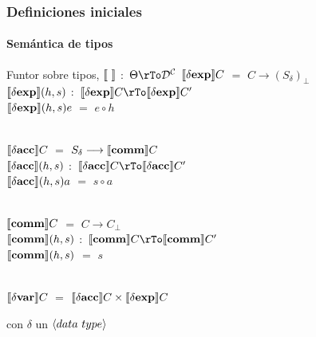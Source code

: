 \documentclass{beamer} %
\begin{document}
\begin{frame}\small
\frametitle{Definiciones iniciales}
\framesubtitle{Sem\'antica de tipos}

\begin{block}{Funtor sobre tipos, $\semBrcks{ \ }$ $:$ $\Theta \rTo \DC$}
$\llbracket  \delta \textbf{exp}  \rrbracket C$ $=$ $C \longrightarrow (S_{ \delta })_\bot$\\
$\llbracket  \delta \textbf{exp}  \rrbracket(h,s)$ $:$ $\semBrcks{ \deltaexp }C \rTo \semBrcks{ \deltaexp }C'$\\
$\llbracket  \delta \textbf{exp}  \rrbracket(h,s)e$ $=$ $e \circ h$ \\
\

$\llbracket  \delta \textbf{acc}  \rrbracket C$ $=$ $S_{\delta} \longrightarrow \llbracket  \textbf{comm}  \rrbracket C$\\
$\llbracket  \delta \textbf{acc}  \rrbracket(h,s)$ $:$ $\semBrcks{ \deltaacc }C \rTo \semBrcks{ \deltaacc }C'$\\
$\llbracket  \delta \textbf{acc}  \rrbracket(h,s)a$ $=$ $s \circ a$\\
\

$\llbracket  \textbf{comm}  \rrbracket C$ $=$ $C \longrightarrow C_\bot$\\
$\llbracket  \textbf{comm}  \rrbracket(h,s)$ $:$ $\semBrcks{ \commt }C \rTo \semBrcks{ \commt }C'$\\
$\llbracket  \textbf{comm}  \rrbracket(h,s)$ $=$ $s$\\
\

$\llbracket  \delta \textbf{var}  \rrbracket C$ $=$ $\llbracket  \delta \textbf{acc}  \rrbracket C \times  \llbracket  \delta \textbf{exp}  \rrbracket C$\\

\end{block}
con $\delta$ un $\langle data \ type \rangle$

\end{frame}
\end{document}
